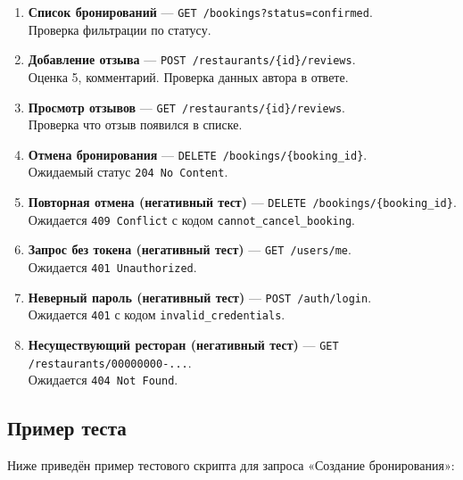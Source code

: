 \documentclass[a4paper,14pt]{extarticle}
\begin{document}
\begin{enumerate}[leftmargin=2cm]
  \item \textbf{Список бронирований} — \texttt{GET /bookings?status=confirmed}.\\
    Проверка фильтрации по статусу.

  \item \textbf{Добавление отзыва} — \texttt{POST /restaurants/\{id\}/reviews}.\\
    Оценка 5, комментарий. Проверка данных автора в ответе.

  \item \textbf{Просмотр отзывов} — \texttt{GET /restaurants/\{id\}/reviews}.\\
    Проверка что отзыв появился в списке.

  \item \textbf{Отмена бронирования} — \texttt{DELETE /bookings/\{booking\_id\}}.\\
    Ожидаемый статус \texttt{204 No Content}.

  \item \textbf{Повторная отмена (негативный тест)} — \texttt{DELETE /bookings/\{booking\_id\}}.\\
    Ожидается \texttt{409 Conflict} с кодом \texttt{cannot\_cancel\_booking}.

  \item \textbf{Запрос без токена (негативный тест)} — \texttt{GET /users/me}.\\
    Ожидается \texttt{401 Unauthorized}.

  \item \textbf{Неверный пароль (негативный тест)} — \texttt{POST /auth/login}.\\
    Ожидается \texttt{401} с кодом \texttt{invalid\_credentials}.

  \item \textbf{Несуществующий ресторан (негативный тест)} — \texttt{GET /restaurants/00000000-...}.\\
    Ожидается \texttt{404 Not Found}.
\end{enumerate}

\subsection{Пример теста}

Ниже приведён пример тестового скрипта для запроса «Создание бронирования»:
\end{document}
